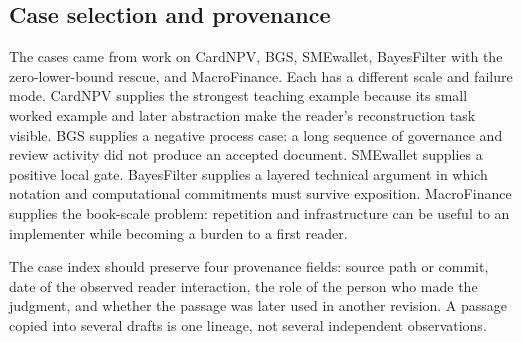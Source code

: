 \subsection{Case selection and provenance}

The cases came from work on CardNPV, BGS, SMEwallet, BayesFilter with the
zero-lower-bound rescue, and MacroFinance. Each has a different scale and
failure mode. CardNPV supplies the strongest teaching example because its
small worked example and later abstraction make the reader's reconstruction task
visible. BGS supplies a negative process case: a long sequence of governance
and review activity did not produce an accepted document. SMEwallet supplies
a positive local gate. BayesFilter supplies a layered technical argument in
which notation and computational commitments must survive exposition.
MacroFinance supplies the book-scale problem: repetition and infrastructure
can be useful to an implementer while becoming a burden to a first reader.

The case index should preserve four provenance fields: source path or commit,
date of the observed reader interaction, the role of the person who made the
judgment, and whether the passage was later used in another revision. A
passage copied into several drafts is one lineage, not several independent
observations.


